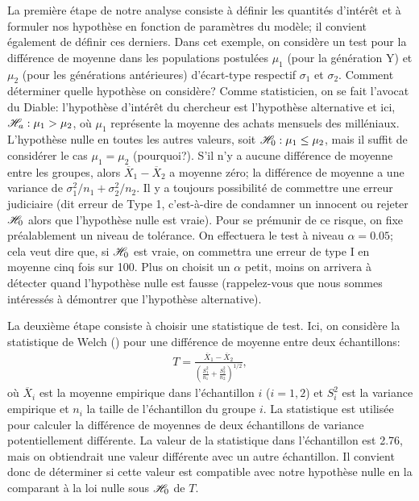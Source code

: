 \documentclass[
  11pt,
  letterpaper,
]{book}
\begin{document}
La première étape de notre analyse consiste à définir les quantités d'intérêt et à formuler nos hypothèse en fonction de paramètres du modèle; il convient également de définir ces derniers. Dans cet exemple, on considère un test pour la différence de moyenne dans les populations postulées \(\mu_1\) (pour la génération Y) et \(\mu_2\) (pour les générations antérieures) d'écart-type respectif \(\sigma_1\) et \(\sigma_2\). Comment déterminer quelle hypothèse on considère? Comme statisticien, on se fait l'avocat du Diable: l'hypothèse d'intérêt du chercheur est l'hypothèse alternative et ici, \(\mathscr{H}_a: \mu_1 > \mu_2\), où \(\mu_1\) représente la moyenne des achats mensuels des milléniaux. L'hypothèse nulle en toutes les autres valeurs, soit \(\mathscr{H}_0: \mu_1 \leq \mu_2\), mais il suffit de considérer le cas \(\mu_1=\mu_2\) (pourquoi?). S'il n'y a aucune différence de moyenne entre les groupes, alors \(\overline{X}_1-\overline{X}_2\) a moyenne zéro; la différence de moyenne a une variance de \(\sigma^2_1/n_1+\sigma^2_2/n_2\). Il y a toujours possibilité de commettre une erreur judiciaire (dit erreur de Type 1, c'est-à-dire de condamner un innocent ou rejeter \(\mathscr{H}_0\) alors que l'hypothèse nulle est vraie). Pour se prémunir de ce risque, on fixe préalablement un niveau de tolérance. On effectuera le test à niveau \(\alpha=0.05\); cela veut dire que, si \(\mathscr{H}_0\) est vraie, on commettra une erreur de type I en moyenne cinq fois sur 100. Plus on choisit un \(\alpha\) petit, moins on arrivera à détecter quand l'hypothèse nulle est fausse (rappelez-vous que nous sommes intéressés à démontrer que l'hypothèse alternative).

La deuxième étape consiste à choisir une statistique de test. Ici, on considère la statistique de Welch (\citet{Welch:1947}) pour une différence de moyenne entre deux échantillons:
\begin{align*}
T = \frac{\overline{X}_1 - \overline{X}_2}{\left(\frac{S_1^2}{n_1}+\frac{S_2^2}{n_2} \right)^{1/2}}, 
\end{align*}
où \(\overline{X}_i\) est la moyenne empirique dans l'échantillon \(i\) (\(i=1, 2\)) et \(S_i^2\) est la variance empirique et \(n_i\) la taille de l'échantillon du groupe \(i\). La statistique est utilisée pour calculer la différence de moyennes de deux échantillons de variance potentiellement différente. La valeur de la statistique dans l'échantillon est 2.76, mais on obtiendrait une valeur différente avec un autre échantillon. Il convient donc de déterminer si cette valeur est compatible avec notre hypothèse nulle en la comparant à la loi nulle sous \(\mathscr{H}_0\) de \(T\).
\end{document}
